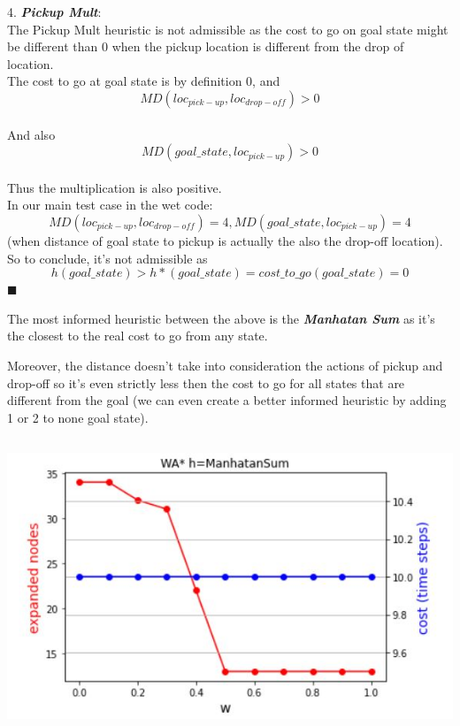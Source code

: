 \documentclass[12pt]{article}
\newcommand{\qed}{\hfill$\blacksquare$}
\begin{document}
4. {\textit{\textbf{Pickup Mult}}}:\\
The Pickup Mult heuristic is not admissible as the cost to go on goal state might be different than 0 when the pickup location is different from the drop of location.\\
The cost to go at goal state is by definition 0, and $$MD(loc_{pick-up},loc_{drop-off}) > 0$$\\
And also
$$MD(goal\_state,loc_{pick-up}) > 0$$\\
Thus the multiplication is also positive.\\
In our main test case in the wet code:
$$MD(loc_{pick-up},loc_{drop-off})=4, MD(goal\_state,loc_{pick-up})=4$$
(when distance of goal state to pickup is actually the also the drop-off location).
So to conclude, it's not admissible as $$h(goal\_state) > h*(goal\_state) = cost\_to\_go(goal\_state) = 0$$
\qed

The most informed heuristic between the above is the {\textit{\textbf{Manhatan Sum}}} as it's the closest to the real cost to go from any state.

Moreover, the distance doesn't take into consideration the actions of pickup and drop-off so it's even strictly less then the cost to go for all states that are different from the goal (we can even create a better informed heuristic by adding 1 or 2 to none goal state).

\subsection{}
\includegraphics[scale=1]{w_graph.JPG}\\
\end{document}
